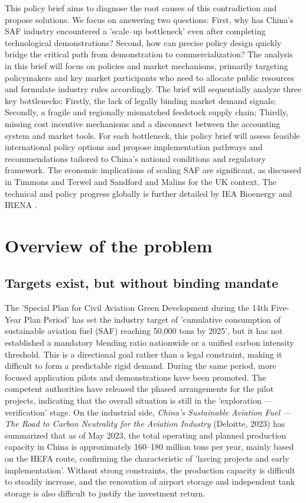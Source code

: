 \documentclass[a4paper,11pt]{article}
\begin{document}
This policy brief aims to diagnose the root causes of this contradiction and propose solutions. We focus on answering two questions: First, why has China's SAF industry encountered a 'scale--up bottleneck' even after completing technological demonstrations? Second, how can precise policy design quickly bridge the critical path from demonstration to commercialization?
The analysis in this brief will focus on policies and market mechanisms, primarily targeting policymakers and key market participants who need to allocate public resources and formulate industry rules accordingly. The brief will sequentially analyze three key bottlenecks: Firstly, the lack of legally binding market demand signals; Secondly, a fragile and regionally mismatched feedstock supply chain; Thirdly, missing cost incentive mechanisms and a disconnect between the accounting system and market tools. For each bottleneck, this policy brief will assess feasible international policy options and propose implementation pathways and recommendations tailored to China's national conditions and regulatory framework. The economic implications of scaling SAF are significant, as discussed in Timmons and Terwel \cite{timmons2022} and Sandford and Malins \cite{sandford2024} for the UK context. The technical and policy progress globally is further detailed by IEA Bioenergy \cite{iea2024} and IRENA \cite{irena2024}.

\section{Overview of the problem}
\subsection{Targets exist, but without binding mandate}
The 'Special Plan for Civil Aviation Green Development during the 14th Five-Year Plan Period' \cite{caac2021} has set the industry target of 'cumulative consumption of sustainable aviation fuel (SAF) reaching 50,000 tons by 2025', but it has not established a mandatory blending ratio nationwide or a unified carbon intensity threshold. This is a directional goal rather than a legal constraint, making it difficult to form a predictable rigid demand. During the same period, more focused application pilots and demonstrations have been promoted. The competent authorities have released the phased arrangements for the pilot projects, indicating that the overall situation is still in the 'exploration --- verification' stage. On the industrial side, \textit{China's Sustainable Aviation Fuel --- The Road to Carbon Neutrality for the Aviation Industry} (Deloitte, 2023) \cite{deloitte2023} has summarized that as of May 2023, the total operating and planned production capacity in China is approximately 160--180 million tons per year, mainly based on the HEFA route, confirming the characteristic of 'having projects and early implementation'. Without strong constraints, the production capacity is difficult to steadily increase, and the renovation of airport storage and independent tank storage is also difficult to justify the investment return.
\end{document}
